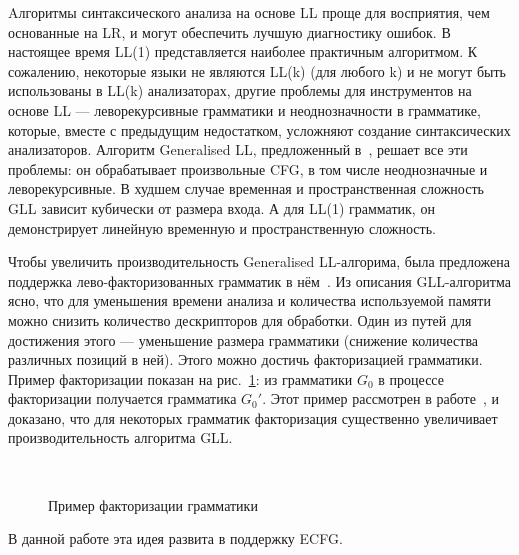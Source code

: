 \documentclass[12pt]{matmex-diploma-custom}
\begin{document}
	Aлгоритмы синтаксического анализа на основе 
    LL проще для восприятия, чем основанные на LR, и могут
	обеспечить лучшую диагностику ошибок. В настоящее время LL(1) представляется
	наиболее практичным алгоритмом. К сожалению, некоторые языки не являются LL(k) (для любого k)
    и не могут быть использованы в LL(k) анализаторах, другие проблемы для инструментов на основе LL 
    --- леворекурсивные грамматики и неоднозначности в грамматике, 
	которые, вместе с предыдущим недостатком, усложняют создание синтаксических 
	анализаторов. Алгоритм Generalised LL, предложенный в~\cite{scott2010gll}, решает 
	все эти проблемы: он обрабатывает произвольные CFG, в том числе неоднозначные и
	леворекурсивные.
	В худшем случае временная и пространственная сложность GLL зависит кубически от 
	размера входа. А для LL(1) грамматик, он демонстрирует линейную временную и
	пространственную сложность.
    
    Чтобы увеличить производительность Generalised LL-алгорима, была предложена поддержка 
    лево-факторизованных грамматик в нём~\cite{scott2016structuring}.
    Из описания GLL-алгоритма ясно, что для уменьшения времени анализа и количества используемой памяти
    можно снизить количество дескрипторов для обработки. Один из путей для достижения этого --- 
    уменьшение размера грамматики (снижение количества различных позиций в ней).
    Этого можно достичь факторизацией грамматики. Пример факторизации показан на рис.~\ref{fig:ExampleOfFactorization}:
    из грамматики $G_0$ в процессе факторизации получается грамматика $G_0'$.
    Этот пример рассмотрен в работе~\cite{scott2016structuring}, и доказано, что для некоторых грамматик факторизация 
    существенно увеличивает производительность алгоритма GLL.
    \begin{figure}
        \centering
        ~
        \caption{Пример факторизации грамматики}
        \label{fig:ExampleOfFactorization}
    \end{figure}
    В данной работе эта идея развита в поддержку ECFG.
	
\end{document}

